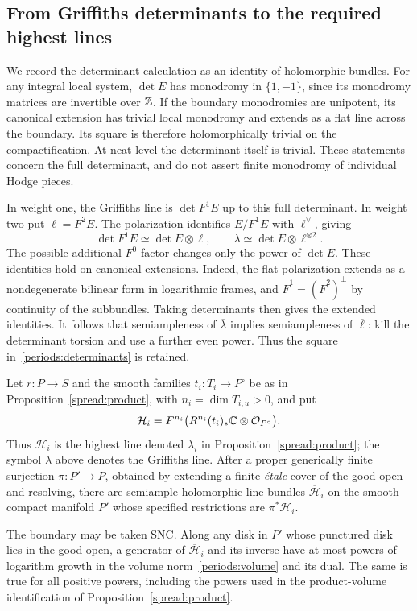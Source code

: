 \subsection{From Griffiths determinants to the required highest lines}

We record the determinant calculation as an identity of holomorphic
bundles.  For any integral local system, $\det E$ has monodromy in
$\{1,-1\}$, since its monodromy matrices are invertible over $\mathbb Z$.
If the boundary monodromies are unipotent, its canonical extension has
trivial local monodromy and extends as a flat line across the boundary.
Its square is therefore holomorphically trivial on the compactification.
At neat level the determinant itself is trivial.  These statements concern
the full determinant, and do not assert finite monodromy of individual
Hodge pieces.

In weight one, the Griffiths line is $\det F^1E$ up to this full
determinant.  In weight two put $\ell=F^2E$.  The polarization identifies
$E/F^1E$ with $\ell^\vee$, giving
\begin{equation}\label{periods:determinants}
 \det F^1E\simeq\det E\otimes\ell,
 \qquad
 \lambda\simeq\det E\otimes\ell^{\otimes2}.
\end{equation}
The possible additional $F^0$ factor changes only the power of $\det E$.
These identities hold on canonical extensions.  Indeed, the flat
polarization extends as a nondegenerate bilinear form in logarithmic
frames, and $\overline F^1=(\overline F^2)^\perp$ by continuity of the
subbundles.  Taking determinants then gives the extended identities.
It follows that semiampleness of $\overline\lambda$ implies semiampleness
of $\overline\ell$: kill the determinant torsion and use a further even
power.  Thus the square in~\eqref{periods:determinants} is retained.

\begin{proposition}
\label{periods:semiample}
Let $r:P\to S$ and the smooth families $t_i:T_i\to P^\circ$ be as in
Proposition~\ref{spread:product}, with $n_i=\dim T_{i,u}>0$, and put
\[
 \mathcal H_i=F^{n_i}\bigl(R^{n_i}(t_i)_*\mathbb C\otimes\mathcal O_{P^\circ}\bigr).
\]
Thus $\mathcal H_i$ is the highest line denoted $\lambda_i$ in
Proposition~\ref{spread:product}; the symbol $\lambda$ above denotes
the Griffiths line.
After a proper generically finite surjection $\pi:P'\to P$, obtained by
extending a finite \emph{\'etale} cover of the good open and resolving,
there are semiample holomorphic line bundles $\overline{\mathcal H}_i$
on the smooth compact manifold $P'$ whose specified restrictions are
$\pi^*\mathcal H_i$.

The boundary may be taken SNC.  Along any disk in $P'$ whose punctured
disk lies in the good open, a generator of
$\overline{\mathcal H}_i$ and its inverse have at most powers-of-logarithm
growth in the volume norm~\eqref{periods:volume} and its dual.  The same
is true for all positive powers, including the powers used in the
product-volume identification of Proposition~\ref{spread:product}.
\end{proposition}

